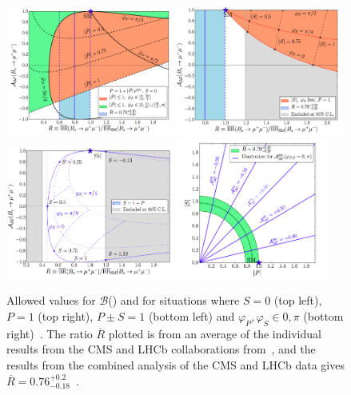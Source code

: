 \begin{figure}[tbp]
    \centering
        \includegraphics[width=0.49\textwidth]{./Figs/Theory/NP_S_0.png}
        \includegraphics[width=0.49\textwidth]{./Figs/Theory/NP_P_1.png}
        \includegraphics[width=0.49\textwidth]{./Figs/Theory/NP_P_pm_S_1.png}        
        \includegraphics[width=0.45\textwidth]{./Figs/Theory/NP_phi.png}
    \caption{Allowed values for $\mathcal{B}$(\bsmumu) and \ADG for situations where $S=0$ (top left), $P=1$ (top right), $P \pm S = 1$ (bottom left) and $\varphi_P, \varphi_S \in {0, \pi}$ (bottom right)~\cite{Buras:2013uqa,Knegjens:2014zva}. The ratio $\overline{R}$ plotted is from an average of the individual results from the CMS and LHCb collaborations from~\cite{CMSandLHCbCollaborations:2013pla}, and the results from the combined analysis of the CMS and LHCb data gives $\overline{R} = 0.76^{+0.2}_{-0.18}$~\cite{CMS:2014xfa}.}
    \label{fig:NPmodelsB}
\end{figure}

